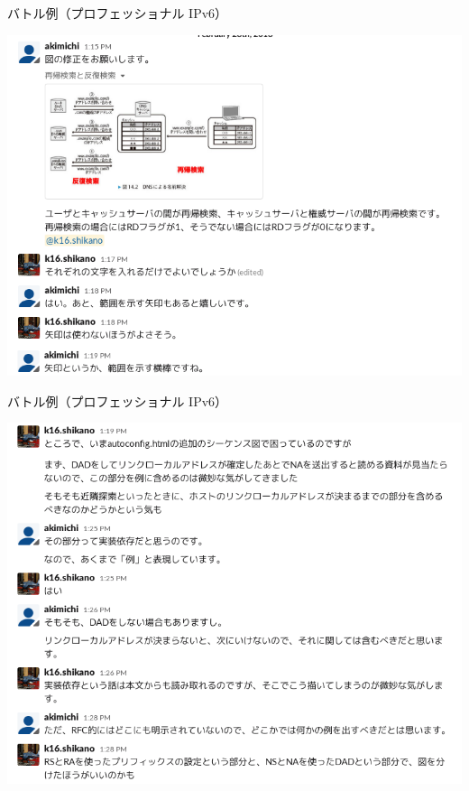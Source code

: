 \documentclass[14pt,dvipdfmx,uplatex]{beamer}
\begin{document}
\begin{frame}[t]{\inhibitglue バトル例（プロフェッショナル IPv6）}
  \sffamily
  \begin{center}
  \vspace*{-2ex}
  \includegraphics[height=0.85\paperheight]{figures/battle1.png}
  \end{center}
\end{frame}

\begin{frame}[t]{\inhibitglue バトル例（プロフェッショナル IPv6）}
  \sffamily
  \vspace*{-2ex}
  \begin{center}
  \includegraphics[height=0.85\paperheight]{figures/battle2.png}
  \end{center}
\end{frame}
\end{document}
